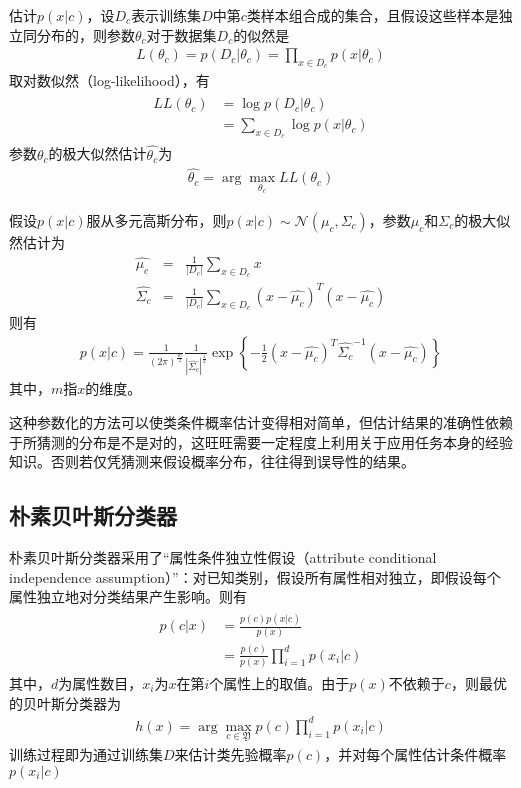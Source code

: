 估计$p(x|c)$，设$D_c$表示训练集$D$中第$c$类样本组合成的集合，且假设这些样本是独立同分布的，则参数$\theta_c$对于数据集$D_c$的似然是
\begin{eqnarray}
L(\theta_c)=p(D_c|\theta_c)=\prod_{x\in D_c}p(x|\theta_c)
\end{eqnarray}
取对数似然（log-likelihood），有
\begin{eqnarray}
\begin{aligned}
LL(\theta_c) &= \log p(D_c|\theta_c)\\
&=\sum_{x\in D_c}\log p(x|\theta_c)
\end{aligned}
\end{eqnarray}
参数$\theta_c$的极大似然估计$\hat{\theta_c}$为
\begin{eqnarray}
\hat{\theta_c}=\arg\max_{\theta_c}LL(\theta_c)
\end{eqnarray}

假设$p(x|c)$服从多元高斯分布，则$p(x|c)\sim \mathcal{N}(\mu_c,\Sigma_c)$，参数$\mu_c$和$\Sigma_c$的极大似然估计为
\begin{eqnarray}
\hat{\mu_c}&=&\frac{1}{|D_c|}\sum_{x\in D_c}x\\
\hat{\Sigma_c}&=&\frac{1}{|D_c|}\sum_{x\in D_c}(x-\hat{\mu_c})^T(x-\hat{\mu_c})
\end{eqnarray}
则有
\begin{eqnarray}
p(x|c)=\frac{1}{(2\pi)^{\frac{m}{2}}}\frac{1}{|\hat{\Sigma_c}|^\frac{1}{2}}\exp
\left\lbrace
-\frac{1}{2}(x-\hat{\mu_c})^T\hat{\Sigma_c}^{-1}(x-\hat{\mu_c})\right\rbrace
\end{eqnarray}
其中，$m$指$x$的维度。

这种参数化的方法可以使类条件概率估计变得相对简单，但估计结果的准确性依赖于所猜测的分布是不是对的，这旺旺需要一定程度上利用关于应用任务本身的经验知识。否则若仅凭猜测来假设概率分布，往往得到误导性的结果。

\subsection{朴素贝叶斯分类器}
朴素贝叶斯分类器采用了“属性条件独立性假设（attribute conditional independence assumption）”：对已知类别，假设所有属性相对独立，即假设每个属性独立地对分类结果产生影响。则有
\begin{eqnarray}
\begin{aligned}
p(c|x)&=\frac{p(c)p(x|c)}{p(x)}\\
&=\frac{p(c)}{p(x)}\prod_{i=1}^dp(x_i|c)
\end{aligned}
\end{eqnarray}
其中，$d$为属性数目，$x_i$为$x$在第$i$个属性上的取值。由于$p(x)$不依赖于$c$，则最优的贝叶斯分类器为
\begin{eqnarray}
h(x)=\arg\max_{c\in\mathfrak{Y}}p(c)\prod_{i=1}^dp(x_i|c)
\end{eqnarray}
训练过程即为通过训练集$D$来估计类先验概率$p(c)$，并对每个属性估计条件概率$p(x_i|c)$

